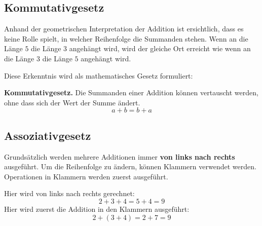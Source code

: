 \subsection{Kommutativgesetz}

Anhand der geometrischen Interpretation der Addition ist ersichtlich, dass es keine Rolle spielt, in welcher Reihenfolge die Summanden stehen. Wenn an die Länge $5$ die Länge $3$ angehängt wird, wird der gleiche Ort erreicht wie wenn an die Länge $3$ die Länge $5$ angehängt wird.
\begin{center}
\end{center}
Diese Erkenntnis wird als mathematisches Gesetz formuliert:
\begin{theorem}
  \textbf{Kommutativgesetz.} Die Summanden einer Addition können vertauscht werden, ohne dass sich der Wert der Summe ändert.
  \[
    a + b = b + a
  \]
\end{theorem}

\subsection{Assoziativgesetz}

Grundsätzlich werden mehrere Additionen immer \textbf{von links nach rechts} ausgeführt. Um die Reihenfolge zu ändern, können Klammern verwendet werden. Operationen in Klammern werden zuerst ausgeführt.
\begin{example}
  Hier wird von links nach rechts gerechnet:
  \[
    2 + 3 + 4 = 5 + 4 = 9
  \]
  Hier wird zuerst die Addition in den Klammern ausgeführt:
  \[
    2 + (3 + 4) = 2 + 7 = 9
  \]
\end{example}

